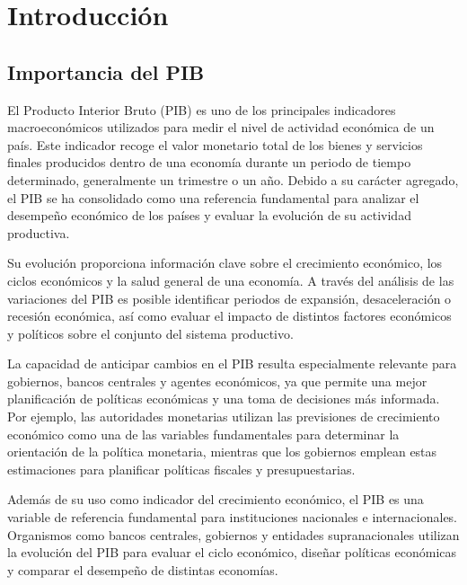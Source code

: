 
\chapter{Introducción}

\section{Importancia del PIB}

El Producto Interior Bruto (PIB) es uno de los principales indicadores macroeconómicos utilizados para medir el nivel de actividad económica de un país. Este indicador recoge el valor monetario total de los bienes y servicios finales producidos dentro de una economía durante un periodo de tiempo determinado, generalmente un trimestre o un año. Debido a su carácter agregado, el PIB se ha consolidado como una referencia fundamental para analizar el desempeño económico de los países y evaluar la evolución de su actividad productiva.

Su evolución proporciona información clave sobre el crecimiento económico, los ciclos económicos y la salud general de una economía. A través del análisis de las variaciones del PIB es posible identificar periodos de expansión, desaceleración o recesión económica, así como evaluar el impacto de distintos factores económicos y políticos sobre el conjunto del sistema productivo.

La capacidad de anticipar cambios en el PIB resulta especialmente relevante para gobiernos, bancos centrales y agentes económicos, ya que permite una mejor planificación de políticas económicas y una toma de decisiones más informada. Por ejemplo, las autoridades monetarias utilizan las previsiones de crecimiento económico como una de las variables fundamentales para determinar la orientación de la política monetaria, mientras que los gobiernos emplean estas estimaciones para planificar políticas fiscales y presupuestarias.

Además de su uso como indicador del crecimiento económico, el PIB es una variable de referencia fundamental para instituciones nacionales e internacionales. Organismos como bancos centrales, gobiernos y entidades supranacionales utilizan la evolución del PIB para evaluar el ciclo económico, diseñar políticas económicas y comparar el desempeño de distintas economías. \citet{oecd_understanding_national_accounts_2014}

